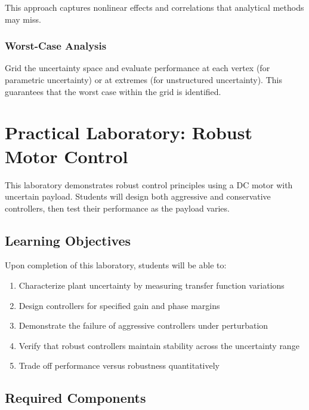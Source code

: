 This approach captures nonlinear effects and correlations that analytical methods may miss.

\subsubsection{Worst-Case Analysis}

Grid the uncertainty space and evaluate performance at each vertex (for parametric uncertainty) or at extremes (for unstructured uncertainty). This guarantees that the worst case within the grid is identified.

\section{Practical Laboratory: Robust Motor Control}
\label{sec:lab}

This laboratory demonstrates robust control principles using a DC motor with uncertain payload. Students will design both aggressive and conservative controllers, then test their performance as the payload varies.

\subsection{Learning Objectives}

Upon completion of this laboratory, students will be able to:
\begin{enumerate}
    \item Characterize plant uncertainty by measuring transfer function variations
    \item Design controllers for specified gain and phase margins
    \item Demonstrate the failure of aggressive controllers under perturbation
    \item Verify that robust controllers maintain stability across the uncertainty range
    \item Trade off performance versus robustness quantitatively
\end{enumerate}

\subsection{Required Components}

